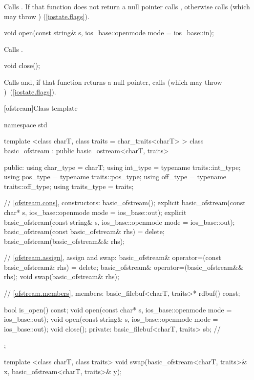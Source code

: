 \begin{itemdescr}
\pnum
\effects
Calls
.
If that function does not return a null pointer
calls ,
otherwise calls
(which may throw
) (\ref{iostate.flags}).
\end{itemdescr}

%
\begin{itemdecl}
void open(const string& s, ios_base::openmode mode = ios_base::in);
\end{itemdecl}

\begin{itemdescr}
\pnum
\effects Calls .
\end{itemdescr}

%
\begin{itemdecl}
void close();
\end{itemdecl}

\begin{itemdescr}
\pnum
\effects
Calls
and, if that function returns
a null pointer,
calls
(which may throw
)~(\ref{iostate.flags}).
\end{itemdescr}

[ofstream]{Class template }

%
\begin{codeblock}
namespace std {
  template <class charT, class traits = char_traits<charT> >
  class basic_ofstream
    : public basic_ostream<charT, traits> {
  public:
    using char_type   = charT;
    using int_type    = typename traits::int_type;
    using pos_type    = typename traits::pos_type;
    using off_type    = typename traits::off_type;
    using traits_type = traits;

    // \ref{ofstream.cons}, constructors:
    basic_ofstream();
    explicit basic_ofstream(const char* s,
                            ios_base::openmode mode = ios_base::out);
    explicit basic_ofstream(const string& s,
                            ios_base::openmode mode = ios_base::out);
    basic_ofstream(const basic_ofstream& rhs) = delete;
    basic_ofstream(basic_ofstream&& rhs);

    // \ref{ofstream.assign}, assign and swap:
    basic_ofstream& operator=(const basic_ofstream& rhs) = delete;
    basic_ofstream& operator=(basic_ofstream&& rhs);
    void swap(basic_ofstream& rhs);

    // \ref{ofstream.members}, members:
    basic_filebuf<charT, traits>* rdbuf() const;

    bool is_open() const;
    void open(const char* s, ios_base::openmode mode = ios_base::out);
    void open(const string& s, ios_base::openmode mode = ios_base::out);
    void close();
  private:
    basic_filebuf<charT, traits> sb; // \expos
  };

  template <class charT, class traits>
    void swap(basic_ofstream<charT, traits>& x,
              basic_ofstream<charT, traits>& y);
}
\end{codeblock}

